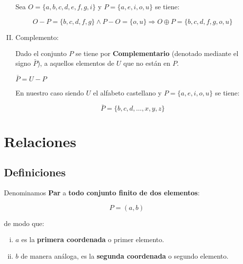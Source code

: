 \begin{enumerate}[I.]
{\ejem Sea $O = \{a,b,c,d,e,f,g,i\}$ y $P = \{a,e,i,o,u\}$ se tiene:

\begin{equation}
O - P = \{b,c,d,f,g\} \wedge P - O = \{o,u\} \Rightarrow O \oplus P =
\{b,c,d,f,g,o,u\}
\end{equation}



}\item Complemento: {

 Dado el conjunto $P$ se tiene por \textbf{Complementario} (denotado
mediante el signo $\bar{P}$), a aquellos elementos de $U$ que no están en $P$.

\form $\bar{P} = U - P$

\ejem En nuestro caso siendo $U$ el alfabeto castellano y $P = \{a,e,i,o,u\}$ se tiene:

\begin{equation}
\bar{P} = \{b,c,d,\ldots,x,y,z\}
\end{equation}



}%

\end{enumerate}


\section{Relaciones}

\subsection{Definiciones}

 Denominamos \textbf{Par} a \textbf{todo conjunto finito de dos elementos}:

\begin{equation}
P = (a,b)
\end{equation}

de modo que:

\begin{enumerate}[i.]

\item $a$ es la \textbf{primera coordenada} o primer elemento.

\item $b$ de manera análoga, es la \textbf{segunda coordenada} o segundo 
elemento.

\end{enumerate}

